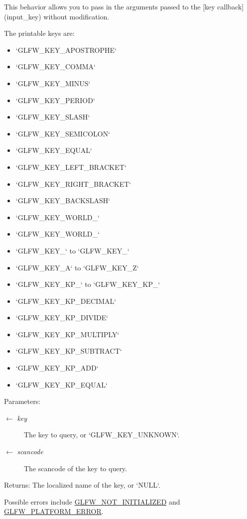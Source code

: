 This behavior allows you to pass in the arguments passed to the \mbox{[}key callback\mbox{]}(input\_\-key) without modification.

The printable keys are:\begin{itemize}
\item `GLFW\_\-KEY\_\-APOSTROPHE`\item `GLFW\_\-KEY\_\-COMMA`\item `GLFW\_\-KEY\_\-MINUS`\item `GLFW\_\-KEY\_\-PERIOD`\item `GLFW\_\-KEY\_\-SLASH`\item `GLFW\_\-KEY\_\-SEMICOLON`\item `GLFW\_\-KEY\_\-EQUAL`\item `GLFW\_\-KEY\_\-LEFT\_\-BRACKET`\item `GLFW\_\-KEY\_\-RIGHT\_\-BRACKET`\item `GLFW\_\-KEY\_\-BACKSLASH`\item `GLFW\_\-KEY\_\-WORLD\_`\item `GLFW\_\-KEY\_\-WORLD\_`\item `GLFW\_\-KEY\_` to `GLFW\_\-KEY\_`\item `GLFW\_\-KEY\_\-A` to `GLFW\_\-KEY\_\-Z`\item `GLFW\_\-KEY\_\-KP\_` to `GLFW\_\-KEY\_\-KP\_`\item `GLFW\_\-KEY\_\-KP\_\-DECIMAL`\item `GLFW\_\-KEY\_\-KP\_\-DIVIDE`\item `GLFW\_\-KEY\_\-KP\_\-MULTIPLY`\item `GLFW\_\-KEY\_\-KP\_\-SUBTRACT`\item `GLFW\_\-KEY\_\-KP\_\-ADD`\item `GLFW\_\-KEY\_\-KP\_\-EQUAL`\end{itemize}


\begin{Desc}
\item[Parameters:]
\begin{description}
\item[\mbox{$\leftarrow$} {\em key}]The key to query, or `GLFW\_\-KEY\_\-UNKNOWN`. \item[\mbox{$\leftarrow$} {\em scancode}]The scancode of the key to query. \end{description}
\end{Desc}
\begin{Desc}
\item[Returns:]The localized name of the key, or `NULL`.\end{Desc}
Possible errors include \hyperlink{group__errors_g2374ee02c177f12e1fa76ff3ed15e14a}{GLFW\_\-NOT\_\-INITIALIZED} and \hyperlink{group__errors_gd44162d78100ea5e87cdd38426b8c7a1}{GLFW\_\-PLATFORM\_\-ERROR}.

